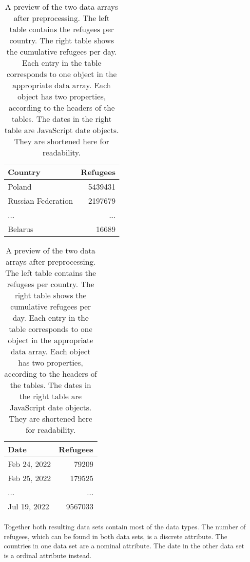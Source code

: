 \begin{table}[ht]
    \centering
    \begin{tabular}{l|r}
        Country & Refugees \\
        \hline \hline
        Poland & 5439431 \\
        Russian Federation & 2197679 \\
        ... & ... \\
        Belarus & 16689 \\
    \end{tabular}
    \quad
    \begin{tabular}{l|r}
        Date & Refugees \\
        \hline \hline
        Feb 24, 2022 & 79209 \\
        Feb 25, 2022 & 179525 \\
        ... & ... \\
        Jul 19, 2022 & 9567033 \\
    \end{tabular}
    \captionsetup{width=0.9\textwidth}
    \caption{A preview of the two data arrays after preprocessing. The left table contains the refugees per country. The right table shows the cumulative refugees per day. Each entry in the table corresponds to one object in the appropriate data array. Each object has two properties, according to the headers of the tables. The dates in the right table are JavaScript date objects. They are shortened here for readability.}
    \label{tab:data}
\end{table}


Together both resulting data sets contain most of the data types. The number of refugees, which can be found in both data sets, is a discrete attribute. The countries in one data set are a nominal attribute. The date in the other data set is a ordinal attribute instead.




